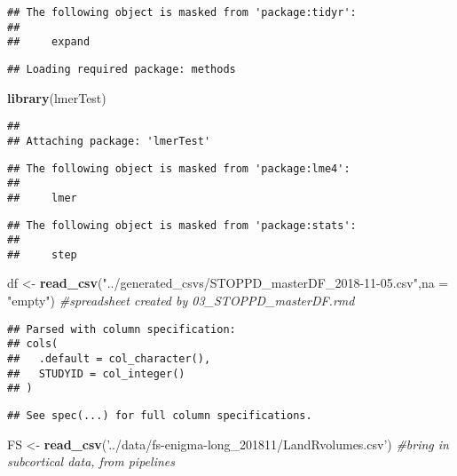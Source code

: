 \documentclass[]{article}
\newenvironment{Shaded}{\begin{snugshade}}{\end{snugshade}}
\newcommand{\KeywordTok}[1]{\textcolor[rgb]{0.13,0.29,0.53}{\textbf{#1}}}
\newcommand{\DataTypeTok}[1]{\textcolor[rgb]{0.13,0.29,0.53}{#1}}
\newcommand{\StringTok}[1]{\textcolor[rgb]{0.31,0.60,0.02}{#1}}
\newcommand{\CommentTok}[1]{\textcolor[rgb]{0.56,0.35,0.01}{\textit{#1}}}
\newcommand{\NormalTok}[1]{#1}
\theoremstyle{definition}
\theoremstyle{definition}
\theoremstyle{definition}
\theoremstyle{remark}
\begin{document}
\begin{verbatim}
## The following object is masked from 'package:tidyr':
## 
##     expand
\end{verbatim}

\begin{verbatim}
## Loading required package: methods
\end{verbatim}

\begin{Shaded}
\begin{Highlighting}[]
\KeywordTok{library}\NormalTok{(lmerTest)}
\end{Highlighting}
\end{Shaded}

\begin{verbatim}
## 
## Attaching package: 'lmerTest'
\end{verbatim}

\begin{verbatim}
## The following object is masked from 'package:lme4':
## 
##     lmer
\end{verbatim}

\begin{verbatim}
## The following object is masked from 'package:stats':
## 
##     step
\end{verbatim}

\begin{Shaded}
\begin{Highlighting}[]
\NormalTok{df <-}\StringTok{ }\KeywordTok{read_csv}\NormalTok{(}\StringTok{"../generated_csvs/STOPPD_masterDF_2018-11-05.csv"}\NormalTok{,}\DataTypeTok{na =} \StringTok{"empty"}\NormalTok{) }\CommentTok{#spreadsheet created by 03_STOPPD_masterDF.rmd}
\end{Highlighting}
\end{Shaded}

\begin{verbatim}
## Parsed with column specification:
## cols(
##   .default = col_character(),
##   STUDYID = col_integer()
## )
\end{verbatim}

\begin{verbatim}
## See spec(...) for full column specifications.
\end{verbatim}

\begin{Shaded}
\begin{Highlighting}[]
\NormalTok{FS <-}\StringTok{ }\KeywordTok{read_csv}\NormalTok{(}\StringTok{'../data/fs-enigma-long_201811/LandRvolumes.csv'}\NormalTok{) }\CommentTok{#bring in subcortical data, from pipelines}
\end{Highlighting}
\end{Shaded}
\end{document}
